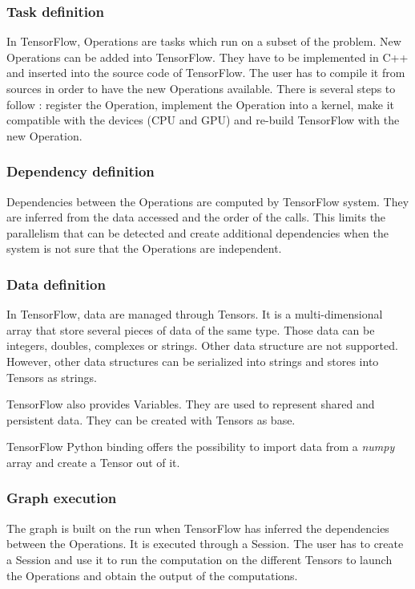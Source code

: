 \subsubsection{Task definition}
In TensorFlow, Operations are tasks which run on a subset of the problem.
New Operations can be added into TensorFlow.
They have to be implemented in C++ and inserted into the source code of TensorFlow.
The user has to compile it from sources in order to have the new Operations available.
There is several steps to follow : register the Operation, implement the Operation into a kernel, make it compatible with the devices (CPU and GPU) and re-build TensorFlow with the new Operation.


\subsubsection{Dependency definition}
Dependencies between the Operations are computed by TensorFlow system.
They are inferred from the data accessed and the order of the calls.
This limits the parallelism that can be detected and create additional dependencies when the system is not sure that the Operations are independent.

\subsubsection{Data definition}
In TensorFlow, data are managed through Tensors.
It is a multi-dimensional array that store several pieces of data of the same type.
Those data can be integers, doubles, complexes or strings.
Other data structure are not supported.
However, other data structures can be serialized into strings and stores into Tensors as strings.

TensorFlow also provides Variables.
They are used to represent shared and persistent data.
They can be created with Tensors as base.

TensorFlow Python binding offers the possibility to import data from a \textit{numpy} array and create a Tensor out of it.

\subsubsection{Graph execution}
The graph is built on the run when TensorFlow has inferred the dependencies between the Operations.
It is executed through a Session.
The user has to create a Session and use it to run the computation on the different Tensors to launch the Operations and obtain the output of the computations.


